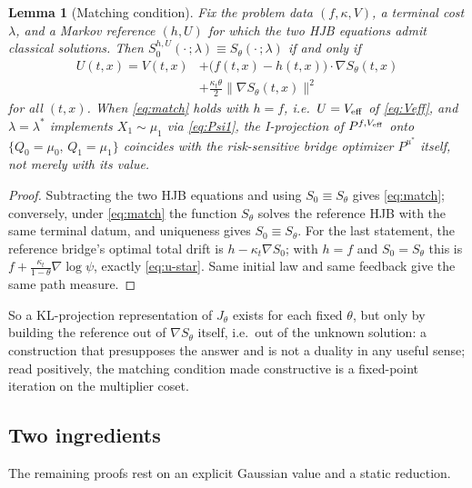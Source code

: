 \documentclass[letterpaper,10pt,conference]{IEEEtran}
\newtheorem{lemma}{Lemma}
\begin{document}
	\begin{lemma}[Matching condition]
		\label{lem:match}
		Fix the problem data $(f,\kappa,V)$, a terminal cost $\lambda$, and a Markov
		reference $(h,U)$ for which the two HJB equations admit classical solutions.
		Then $S_0^{h,U}(\cdot\,;\lambda)\equiv S_\theta(\cdot\,;\lambda)$ if and only if
		\begin{equation}
			\label{eq:match}
			\begin{split}
				U(t,x)=V(t,x)&+\bigl(f(t,x)-h(t,x)\bigr)\cdot\nabla S_\theta(t,x)\\
				&+\frac{\kappa_t\theta}{2}\|\nabla S_\theta(t,x)\|^2
			\end{split}
		\end{equation}
		for all $(t,x)$. When \eqref{eq:match} holds with $h=f$, i.e.\
		$U=V_{\rm eff}$ of \eqref{eq:Veff}, and $\lambda=\lambda^*$ implements
		$X_1\sim\mu_1$ via \eqref{eq:Psi1}, the I-projection of $P^{f,V_{\rm eff}}$
		onto $\{Q_0=\mu_0,\,Q_1=\mu_1\}$ coincides with the risk-sensitive bridge optimizer $P^{u^*}$
		itself, not merely with its value.
	\end{lemma}
	
	\begin{proof}
		Subtracting the two HJB equations and using $S_0\equiv S_\theta$ gives
		\eqref{eq:match}; conversely, under \eqref{eq:match} the function
		$S_\theta$ solves the reference HJB with the same terminal datum, and
		uniqueness gives $S_0\equiv S_\theta$. For the last
		statement, the reference bridge's optimal total drift is
		$h-\kappa_t\nabla S_0$; with $h=f$ and $S_0=S_\theta$ this is
		$f+\frac{\kappa_t}{1-\theta}\nabla\log\psi$, exactly \eqref{eq:u-star}.
		Same initial law and same feedback give the same path measure.
	\end{proof}
	
	So a KL-projection representation of $J_\theta$ exists for each fixed $\theta$, but only by building the reference out of $\nabla S_\theta$ itself,
	i.e.\ out of the unknown solution: a construction that presupposes the answer
	and is not a duality in any useful sense; read positively, the matching
	condition made constructive is a fixed-point iteration on the multiplier
	coset.
	
	\subsection{Two ingredients}
	The remaining proofs rest on an explicit Gaussian value and a static
	reduction.
	
\end{document}
